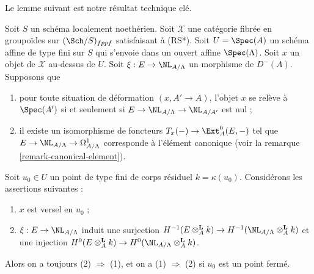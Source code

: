 \noindent
Le lemme suivant est notre résultat technique clé.

\begin{lemma}
\label{lemma-characterize-versal}
Soit $S$ un schéma localement noethérien. Soit $\mathcal{X}$ une catégorie
fibrée en groupoïdes sur $(\Sch/S)_{fppf}$ satisfaisant à (RS*). Soit
$U = \Spec(A)$ un schéma affine de type fini sur $S$ qui s'envoie dans un
ouvert affine $\Spec(\Lambda)$. Soit $x$ un objet de $\mathcal{X}$ au-dessus
de $U$. Soit $\xi : E \to \NL_{A/\Lambda}$ un morphisme de $D^{-}(A)$.
Supposons que
\begin{enumerate}
\item[(i)] pour toute situation de déformation $(x, A' \to A)$, l'objet $x$
se relève à $\Spec(A')$ si et seulement si
$E \to \NL_{A/\Lambda} \to \NL_{A/A'}$ est nul ;
\item[(ii)] il existe un isomorphisme de foncteurs
$T_x(-) \to \Ext^0_A(E, -)$
tel que $E \to \NL_{A/\Lambda} \to \Omega^1_{A/\Lambda}$ corresponde à
l'élément canonique (voir la remarque \ref{remark-canonical-element}).
\end{enumerate}
Soit $u_0 \in U$ un point de type fini de corps résiduel $k = \kappa(u_0)$.
Considérons les assertions suivantes :
\begin{enumerate}
\item $x$ est versel en $u_0$ ;
\item $\xi : E \to \NL_{A/\Lambda}$ induit une surjection
$H^{-1}(E \otimes_A^{\mathbf{L}} k) \to
H^{-1}(\NL_{A/\Lambda} \otimes_A^{\mathbf{L}} k)$
et une injection
$H^0(E \otimes_A^{\mathbf{L}} k) \to
H^0(\NL_{A/\Lambda} \otimes_A^{\mathbf{L}} k)$.
\end{enumerate}
Alors on a toujours (2) $\Rightarrow$ (1), et on a (1) $\Rightarrow$ (2) si
$u_0$ est un point fermé.
\end{lemma}


